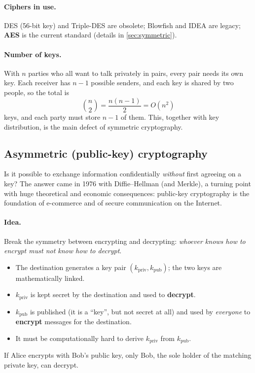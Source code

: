 \paragraph{Ciphers in use.} DES (56-bit key) and Triple-DES are obsolete; Blowfish and IDEA are legacy; \textbf{AES} is the current standard (details in \cref{sec:symmetric}).

\paragraph{Number of keys.} With $n$ parties who all want to talk privately in pairs, every pair needs its own key. Each receiver has $n-1$ possible senders, and each key is shared by two people, so the total is
\[
    \binom{n}{2} = \frac{n(n-1)}{2} = O(n^2)
\]
keys, and each party must store $n-1$ of them. This, together with key distribution, is the main defect of symmetric cryptography.

\subsection{Asymmetric (public-key) cryptography}

Is it possible to exchange information confidentially \emph{without} first agreeing on a key? The answer came in 1976 with Diffie--Hellman (and Merkle), a turning point with huge theoretical and economic consequences: public-key cryptography is the foundation of e-commerce and of secure communication on the Internet.

\paragraph{Idea.} Break the symmetry between encrypting and decrypting: \emph{whoever knows how to encrypt must not know how to decrypt}.
\begin{itemize}
    \item The destination generates a key pair $(k_{\mathrm{priv}}, k_{\mathrm{pub}})$; the two keys are mathematically linked.
    \item $k_{\mathrm{priv}}$ is kept secret by the destination and used to \textbf{decrypt}.
    \item $k_{\mathrm{pub}}$ is published (it is a \enquote{key}, but not secret at all) and used by \emph{everyone} to \textbf{encrypt} messages for the destination.
    \item It must be computationally hard to derive $k_{\mathrm{priv}}$ from $k_{\mathrm{pub}}$.
\end{itemize}
If Alice encrypts with Bob's public key, only Bob, the sole holder of the matching private key, can decrypt.

